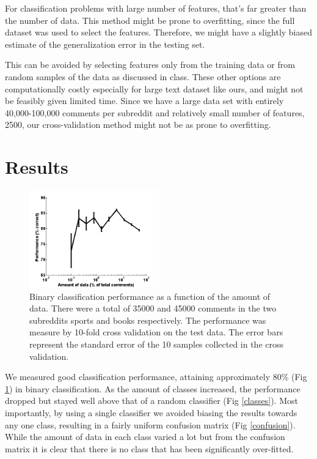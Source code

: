 \documentclass[10pt,twocolumn]{article}
\begin{document}
For classification problems with large number of features, that’s far greater than the number of data. This method might be prone to overfitting, since the full dataset was used to select the features. Therefore, we might have a slightly biased estimate of the generalization error in the testing set.

This can be avoided by selecting features only from the training data or from random samples of the data as discussed in class. These other options are computationally costly especially for large text dataset like ours, and might not be feasibly given limited time. Since we have a large data set with entirely 40,000-100,000 comments per subreddit and relatively small number of features, 2500, our cross-validation method might not be as prone to overfitting.

\section{Results}
\begin{figure}
    \centering
  	\includegraphics[width=0.5\textwidth]{./binary_data.png}
  \caption{ Binary classification performance as a function of the amount of data. There were a total of 35000 and 45000 comments in the two subreddits sports and books respectively. The performance was measure by 10-fold cross validation on the test data. The error bars represent the standard error of the 10 samples collected in the cross validation.}
  	\label{multiclass}
    \end{figure}
We measured good classification performance, attaining approximately $80\%$ (Fig \ref{multiclass}) in binary classification. As the amount of classes increased, the performance dropped but stayed well above that of a random classifier (Fig \ref{classes}). Most importantly, by using a single classifier we avoided biasing the results towards any one class, resulting in a fairly uniform confusion matrix (Fig \ref{confusion}). While the amount of data in each class varied a lot but from the confusion matrix it is clear that there is no class that has been significantly over-fitted.
\end{document}
